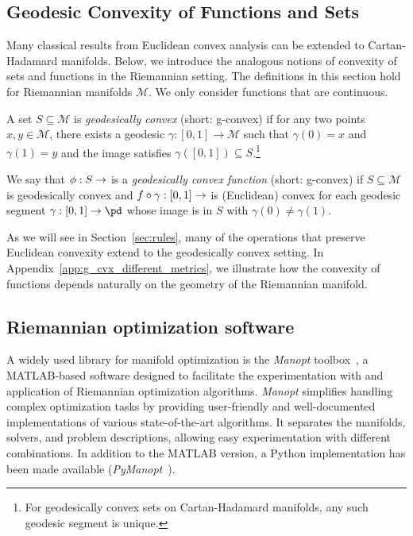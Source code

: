 \documentclass[twoside,11pt]{article}
\begin{document}
\subsection{Geodesic Convexity of Functions and Sets}
Many classical results from Euclidean convex analysis can be extended to Cartan-Hadamard manifolds. Below, we introduce the analogous notions of convexity of sets and functions in the Riemannian setting. The definitions in this section hold for Riemannian manifolds
$\mathcal{M}$. We only consider functions that are continuous. 
%
\begin{definition}\label{def:g-convex-s}
A set $S \subseteq \mathcal{M}$ is \emph{geodesically convex} (short: g-convex) if for any two points $x,y \in \mathcal{M}$, there exists a geodesic $\gamma:[0,1] \to  \mathcal{M}$ such that $\gamma(0) = x$ and $\gamma(1) = y$ and the image satisfies $\gamma([0,1]) \subseteq S$.\footnote{For geodesically convex sets on Cartan-Hadamard manifolds, any such geodesic segment is unique.}
\end{definition}
%
\begin{definition}
\label{def:g-convex-f}
    We say that $\phi: S \to \real$ is a \emph{geodesically convex function} (short: g-convex) if $S \subseteq \mathcal{M}$ is geodesically convex and $f \circ \gamma :[0,1] \to \real$ is (Euclidean) convex for each geodesic segment $\gamma :[0,1] \to \pd$ whose image is in $S$ with $\gamma(0) \neq \gamma(1)$.
\end{definition}
%

As we will see in Section~\ref{sec:rules}, many of the operations that preserve Euclidean convexity extend to the geodesically convex setting. In Appendix~\ref{app:g_cvx_different_metrics}, we illustrate how the convexity of functions depends naturally on the geometry of the Riemannian manifold. 
 

\subsection{Riemannian optimization software}

A widely used library for manifold optimization is the \textsl{Manopt} toolbox~\citep{manopt}, a MATLAB-based software designed to facilitate the experimentation with and application of Riemannian optimization algorithms. \textsl{Manopt} simplifies handling complex optimization tasks by providing user-friendly and well-documented implementations of various state-of-the-art algorithms. It separates the manifolds, solvers, and problem descriptions, allowing easy experimentation with different combinations. 
In addition to the MATLAB version, a Python implementation has been made available (\textsl{PyManopt}~\citep{pymanopt}).
\end{document}

